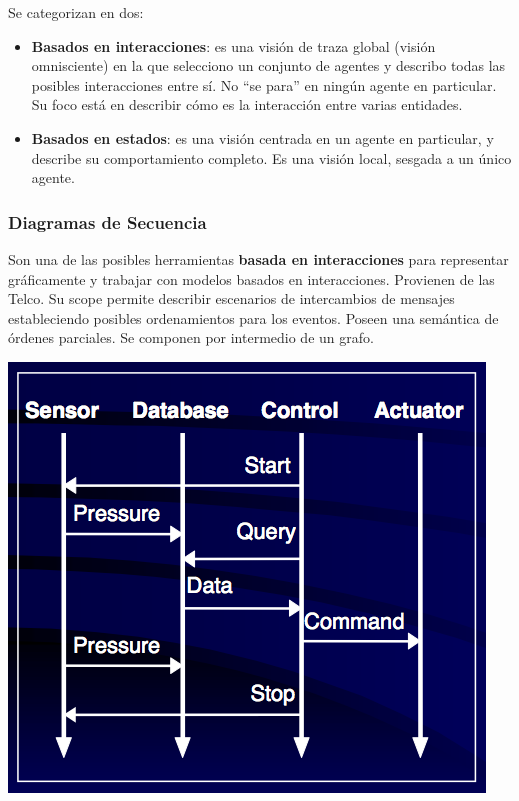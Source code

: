 \documentclass[]{article}
\begin{document}
Se categorizan en dos:
\begin{itemize}
	\item \textbf{Basados en interacciones}: es una visión de traza global (visión omnisciente) en la que selecciono un conjunto de agentes y describo todas las posibles interacciones entre sí. No ``se para'' en ningún agente en particular. Su foco está en describir cómo es la interacción entre varias entidades. 

	\item \textbf{Basados en estados}: es una visión centrada en un agente en particular, y describe su comportamiento completo. Es una visión local, sesgada a un único agente. 
\end{itemize}

\subsubsection{Diagramas de Secuencia}
Son una de las posibles herramientas \textbf{basada en interacciones} para representar gráficamente y trabajar con modelos basados en interacciones. Provienen de las Telco. Su scope permite describir escenarios de intercambios de mensajes estableciendo posibles ordenamientos para los eventos. Poseen una semántica de órdenes parciales. Se componen por intermedio de un grafo.

\begin{center}
	\includegraphics[scale=0.5]{DiagSeq.png}
\end{center}
\end{document}
